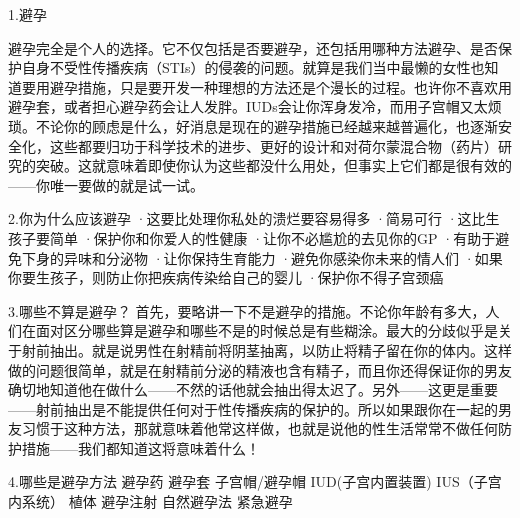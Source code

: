\documentclass[12pt,UTF8]{ctexbook}
\begin{document}
1.避孕

避孕完全是个人的选择。它不仅包括是否要避孕，还包括用哪种方法避孕、是否保护自身不受性传播疾病（STIs）的侵袭的问题。就算是我们当中最懒的女性也知道要用避孕措施，只是要开发一种理想的方法还是个漫长的过程。也许你不喜欢用避孕套，或者担心避孕药会让人发胖。IUDs会让你浑身发冷，而用子宫帽又太烦琐。不论你的顾虑是什么，好消息是现在的避孕措施已经越来越普遍化，也逐渐安全化，这些都要归功于科学技术的进步、更好的设计和对荷尔蒙混合物（药片）研究的突破。这就意味着即使你认为这些都没什么用处，但事实上它们都是很有效的——你唯一要做的就是试一试。

2.你为什么应该避孕
·这要比处理你私处的溃烂要容易得多
·简易可行
·这比生孩子要简单
·保护你和你爱人的性健康
·让你不必尴尬的去见你的GP
·有助于避免下身的异味和分泌物
·让你保持生育能力
·避免你感染你未来的情人们
·如果你要生孩子，则防止你把疾病传染给自己的婴儿
·保护你不得子宫颈癌

3.哪些不算是避孕？
首先，要略讲一下不是避孕的措施。不论你年龄有多大，人们在面对区分哪些算是避孕和哪些不是的时候总是有些糊涂。最大的分歧似乎是关于射前抽出。就是说男性在射精前将阴茎抽离，以防止将精子留在你的体内。这样做的问题很简单，就是在射精前分泌的精液也含有精子，而且你还得保证你的男友确切地知道他在做什么——不然的话他就会抽出得太迟了。另外——这更是重要——射前抽出是不能提供任何对于性传播疾病的保护的。所以如果跟你在一起的男友习惯于这种方法，那就意味着他常这样做，也就是说他的性生活常常不做任何防护措施——我们都知道这将意味着什么！

4.哪些是避孕方法
避孕药
避孕套
子宫帽/避孕帽
IUD(子宫内置装置)
IUS（子宫内系统）
植体
避孕注射
自然避孕法
紧急避孕
\end{document}
